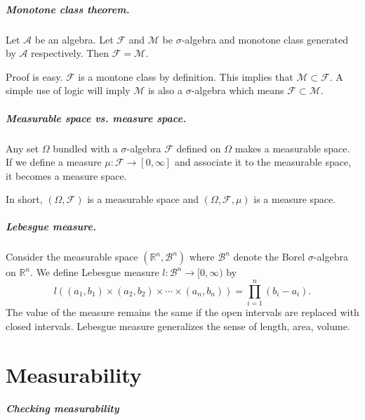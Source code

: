 \documentclass[12pt,english,oneside]{scrbook}
\numberwithin{equation}{chapter}
\theoremstyle{definition}
\theoremstyle{plain}
\begin{document}
\paragraph{Monotone class theorem.}

Let $\mathcal{A}$ be an algebra. Let $\mathcal{F}$ and $\mathcal{M}$ be $\sigma$-algebra and monotone class generated by $\mathcal{A}$ respectively. Then $\mathcal{F} = \mathcal{M}$.

Proof is easy. $\mathcal{F}$ is a montone class by definition. This implies that $\mathcal{M}\subset \mathcal{F}$. A simple use of logic will imply $\mathcal{M}$ is also a $\sigma$-algebra which means $\mathcal{F} \subset \mathcal{M}$.

\paragraph{Measurable space vs. measure space.}

Any set $\Omega$ bundled with a $\sigma$-algebra $\mathcal{F}$ defined on $\Omega$ makes a measurable space. If we define a measure $\mu : \mathcal{F} \to [0,\infty]$ and associate it to the measurable space, it becomes a measure space.

In short, $(\Omega, \mathcal{F})$ is a measurable space and $(\Omega, \mathcal{F}, \mu)$ is a measure space.

\paragraph{Lebesgue measure.}

Consider the measurable space $(\mathbb{R}^n, \mathcal{B}^n)$ where $\mathcal{B}^n$ denote the Borel $\sigma$-algebra on $\mathbb{R}^n$. We define Lebesgue measure $l: \mathcal{B}^n \to [0,\infty)$ by
\begin{equation}
  l((a_1,b_1)\times(a_2,b_2)\times\cdots\times(a_n,b_n)) = \prod_{i=1}^n (b_i-a_i).
\end{equation}
The value of the measure remains the same if the open intervals are replaced with closed intervals. Lebesgue measure generalizes the sense of length, area, volume.

\chapter{Measurability}

\paragraph{Checking measurability}
\end{document}
